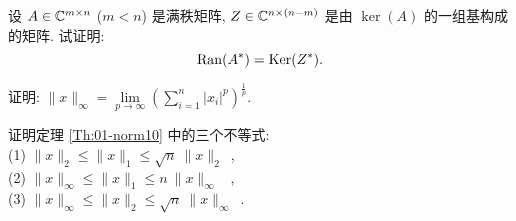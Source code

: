 \begin{exerlist}
	
	\item
	设 $A\in\mathbb{C}^{m\times n}$ ($m<n$) 是满秩矩阵,
	$Z\in\mathbb{C}^{n\times(n-m)}$ 是由 $\ker(A)$ 的一组基构成的矩阵.
	试证明:
	$$ \mathrm{Ran}(A^*) = \mathrm{Ker}(Z^*). $$
	
	\item 证明:
	$\|x\|_\infty=\lim\limits_{p\to\infty}%
	\left(\sum\limits_{i=1}^n |x_i|^p\right)^\frac1p$.
	
	\item 证明定理 \ref{Th:01-norm10} 中的三个不等式: \\
	(1) $\|x\|_2 \leq \|x\|_1 \leq \sqrt{n}\ \|x\|_2$\ ,\\
	(2) $\|x\|_\infty \leq \|x\|_1 \leq n\ \|x\|_\infty$ \ , \\
	(3) $\|x\|_\infty \leq \|x\|_2 \leq \sqrt{n}\ \|x\|_\infty$\ .
	
	
\end{exerlist}
